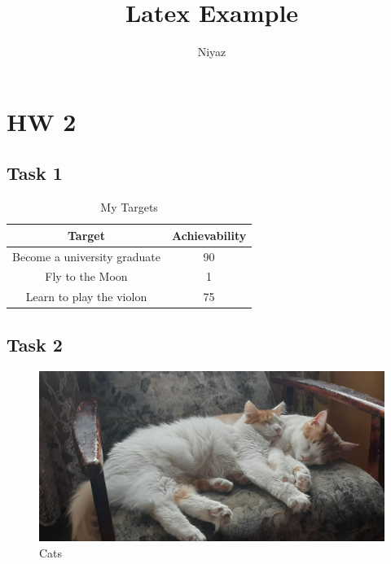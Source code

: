 \documentclass{article}
\title{Latex Example}
\author{Niyaz}
\begin{document}
\maketitle

\section{HW 2}

\subsection{Task 1}


\begin{table}[ht!]
\centering
\begin{tabular}{c|c}
Target&Achievability\\\hline
Become a university graduate&90\\
Fly to the Moon&1\\
Learn to play the violon&75

\end{tabular}
\caption{My Targets}
\end{table}


\subsection{Task 2}


\begin{figure}[ht!]
\centering
\includegraphics[width=0.8\linewidth]{data/image.png}
\caption{Cats}
\end{figure}
\end{document}
